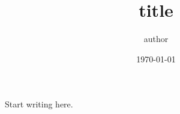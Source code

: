 \documentclass[11pt]{article}
\title{{{title}}}
\author{{{author}}}
\date{\today}
\begin{document}
\maketitle

Start writing here.
\end{document}
